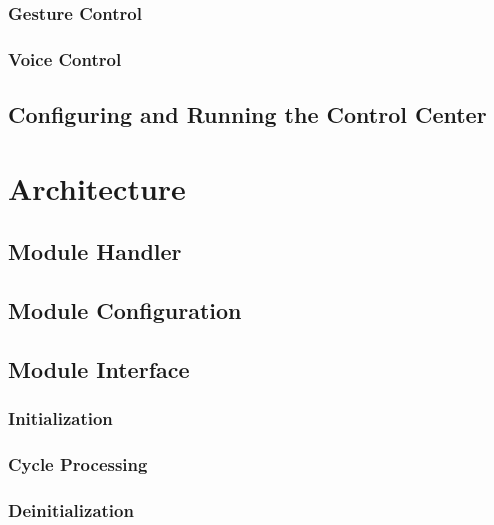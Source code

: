 \documentclass[12pt]{article}
\begin{document}
\subsubsection{Gesture Control}
\label{subsubsec-py-mod-gesture-control}

\subsubsection{Voice Control}
\label{subsubsec-py-mod-voice-control}

\subsection{Configuring and Running the Control Center}
\label{subsection-configure-and-run-control-center}

\section{Architecture}
\label{sec-architecture}

\subsection{Module Handler}
\label{subsec-module-handler}

\subsection{Module Configuration}
\label{subsec-module-config}

\subsection{Module Interface}
\label{subsec-module-interface}

\subsubsection{Initialization}
\label{subsubsec-module-init}

\subsubsection{Cycle Processing}
\label{subsubsec-module-cycle-step}

\subsubsection{Deinitialization}
\label{subsubsec-module-cycle-deinit}
\end{document}
